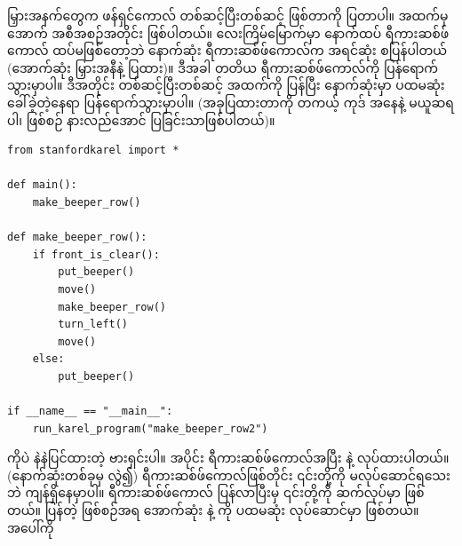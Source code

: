 မြှားအနက်တွေက ဖန်ရှင်ကောလ်  တစ်ဆင့်ပြီးတစ်ဆင့် ဖြစ်တာကို ပြတာပါ။ အထက်မှအောက် အစီ\allowbreak အစဉ်အတိုင်း ဖြစ်ပါတယ်။ ‌လေးကြိမ်မြောက်မှာ နောက်ထပ် ရီကားဆစ်ဖ်ကောလ် ထပ်မဖြစ်တော့ဘဲ နောက်ဆုံး ရီကားဆစ်ဖ်ကောလ်က အရင်ဆုံး  စပြန်ပါတယ် (အောက်ဆုံး မြှားအနီနဲ့ ပြထား)။ ဒီအခါ တတိယ ရီကားဆစ်ဖ်ကောလ်ကို ပြန်ရောက်သွားမှာပါ။ ဒီအတိုင်း တစ်ဆင့်ပြီးတစ်ဆင့် အထက်ကို  ပြန်ပြီး နောက်ဆုံးမှာ ပထမဆုံး ခေါ်ခဲ့တဲ့နေရာ ပြန်ရောက်သွားမှာပါ။ (အခုပြထားတာကို တကယ့်  ကုဒ် အနေနဲ့ မယူဆရပါ၊ ဖြစ်စဉ် နားလည်အောင် ပြခြင်းသာဖြစ်ပါတယ်)။

%
\setlength{\fboxsep}{0pt}
\begin{verbatim}
from stanfordkarel import *

def main():
    make_beeper_row()

def make_beeper_row():
    if front_is_clear():
        put_beeper()
        move()
        make_beeper_row()
        turn_left()
        move()
    else:
        put_beeper()

if __name__ == "__main__":
    run_karel_program("make_beeper_row2")
\end{verbatim}
%

 ကိုပဲ နဲနဲပြင်ထားတဲ့ ဗားရှင်းပါ။   အပိုင်း ရီကားဆစ်ဖ်ကောလ်အပြီး   နဲ့  လုပ်ထားပါတယ်။  (နောက်ဆုံးတစ်ခုမှ လွဲ၍) ရီကားဆစ်ဖ်ကောလ်ဖြစ်တိုင်း  ၎င်းတို့ကို မလုပ်ဆောင်ရသေးဘဲ ကျန်ရှိနေမှာပါ။ ရီကားဆစ်ဖ်ကောလ်  ပြန်လာပြီးမှ ၎င်းတို့ကို ဆက်လုပ်မှာ ဖြစ်တယ်။  ပြန်တဲ့ ဖြစ်စဉ်အရ အောက်ဆုံး  နဲ့  ကို ပထမဆုံး လုပ်ဆောင်မှာ ဖြစ်တယ်။ အပေါ်ကို

